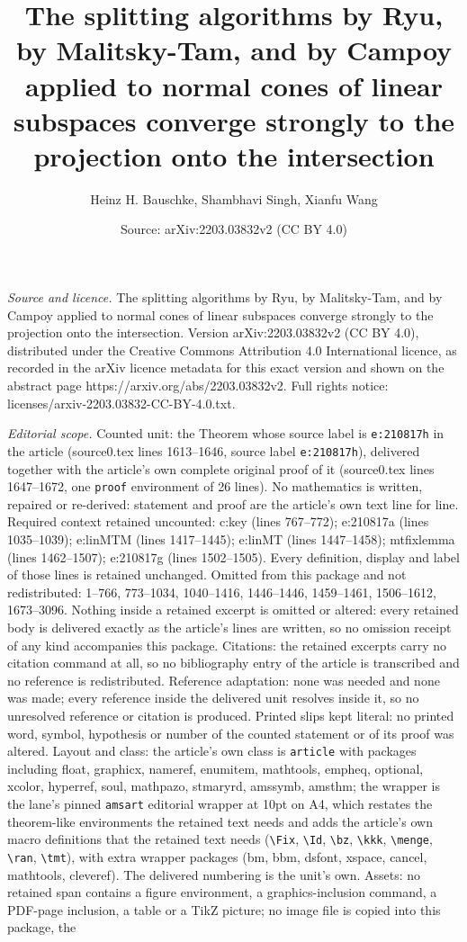 \documentclass[10pt,a4paper]{amsart}
\title[The splitting algorithms by Ryu, by Malitsky-Tam, and by Cam]{The splitting algorithms by Ryu, by Malitsky-Tam, and by Campoy applied to normal cones of linear subspaces converge strongly to the projection onto the intersection}
\author{Heinz H. Bauschke, Shambhavi Singh, Xianfu Wang}
\date{Source: arXiv:2203.03832v2 (CC BY 4.0)}
\begin{document}
\maketitle

\noindent\emph{Source and licence.} The splitting algorithms by Ryu, by Malitsky-Tam, and by Campoy applied to normal cones of linear subspaces converge strongly to the projection onto the intersection. Version arXiv:2203.03832v2 (CC BY 4.0), distributed under the Creative Commons Attribution 4.0 International licence, as recorded in the arXiv licence metadata for this exact version and shown on the abstract page https://arxiv.org/abs/2203.03832v2. Full rights notice: licenses/arxiv-2203.03832-CC-BY-4.0.txt.\par\smallskip

\noindent\textit{Editorial scope.} Counted unit: the Theorem whose source label is \texttt{e:210817h} in the article (source0.tex lines 1613--1646, source label \texttt{e:210817h}), delivered together with the article's own complete original proof of it (source0.tex lines 1647--1672, one \texttt{proof} environment of 26 lines). No mathematics is written, repaired or re-derived: statement and proof are the article's own text line for line. Required context retained uncounted: c:key (lines 767--772); e:210817a (lines 1035--1039); e:linMTM (lines 1417--1445); e:linMT (lines 1447--1458); mtfixlemma (lines 1462--1507); e:210817g (lines 1502--1505). Every definition, display and label of those lines is retained unchanged. Omitted from this package and not redistributed: 1--766, 773--1034, 1040--1416, 1446--1446, 1459--1461, 1506--1612, 1673--3096. Nothing inside a retained excerpt is omitted or altered: every retained body is delivered exactly as the article's lines are written, so no omission receipt of any kind accompanies this package. Citations: the retained excerpts carry no citation command at all, so no bibliography entry of the article is transcribed and no reference is redistributed. Reference adaptation: none was needed and none was made; every reference inside the delivered unit resolves inside it, so no unresolved reference or citation is produced. Printed slips kept literal: no printed word, symbol, hypothesis or number of the counted statement or of its proof was altered. Layout and class: the article's own class is \texttt{article} with packages including float, graphicx, nameref, enumitem, mathtools, empheq, optional, xcolor, hyperref, soul, mathpazo, stmaryrd, amssymb, amsthm; the wrapper is the lane's pinned \texttt{amsart} editorial wrapper at 10pt on A4, which restates the theorem-like environments the retained text needs and adds the article's own macro definitions that the retained text needs (\texttt{\textbackslash Fix}, \texttt{\textbackslash Id}, \texttt{\textbackslash bz}, \texttt{\textbackslash kkk}, \texttt{\textbackslash menge}, \texttt{\textbackslash ran}, \texttt{\textbackslash tmt}), with extra wrapper packages (bm, bbm, dsfont, xspace, cancel, mathtools, cleveref). The delivered numbering is the unit's own. Assets: no retained span contains a figure environment, a graphics-inclusion command, a PDF-page inclusion, a table or a TikZ picture; no image file is copied into this package, the 
\end{document}
